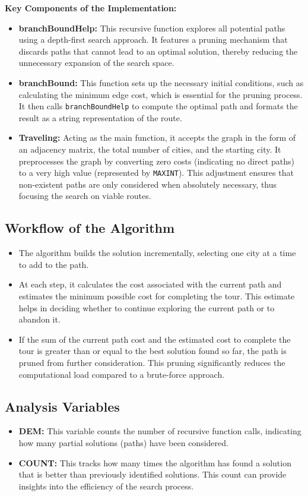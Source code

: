 \documentclass[a4paper]{article}
\begin{document}
\textbf{Key Components of the Implementation:}
\begin{itemize}
    \item \textbf{branchBoundHelp:} This recursive function explores all potential paths using a depth-first search approach. It features a pruning mechanism that discards paths that cannot lead to an optimal solution, thereby reducing the unnecessary expansion of the search space.
    \item \textbf{branchBound:} This function sets up the necessary initial conditions, such as calculating the minimum edge cost, which is essential for the pruning process. It then calls \texttt{branchBoundHelp} to compute the optimal path and formats the result as a string representation of the route.
    \item \textbf{Traveling:} Acting as the main function, it accepts the graph in the form of an adjacency matrix, the total number of cities, and the starting city. It preprocesses the graph by converting zero costs (indicating no direct paths) to a very high value (represented by \texttt{MAXINT}). This adjustment ensures that non-existent paths are only considered when absolutely necessary, thus focusing the search on viable routes.
\end{itemize}

\subsection{Workflow of the Algorithm}
\begin{itemize}
    \item The algorithm builds the solution incrementally, selecting one city at a time to add to the path.
    \item At each step, it calculates the cost associated with the current path and estimates the minimum possible cost for completing the tour. This estimate helps in deciding whether to continue exploring the current path or to abandon it.
    \item If the sum of the current path cost and the estimated cost to complete the tour is greater than or equal to the best solution found so far, the path is pruned from further consideration. This pruning significantly reduces the computational load compared to a brute-force approach.
\end{itemize}

\subsection{Analysis Variables}
\begin{itemize}
    \item \textbf{DEM:} This variable counts the number of recursive function calls, indicating how many partial solutions (paths) have been considered.
    \item \textbf{COUNT:} This tracks how many times the algorithm has found a solution that is better than previously identified solutions. This count can provide insights into the efficiency of the search process.
\end{itemize}
\end{document}
